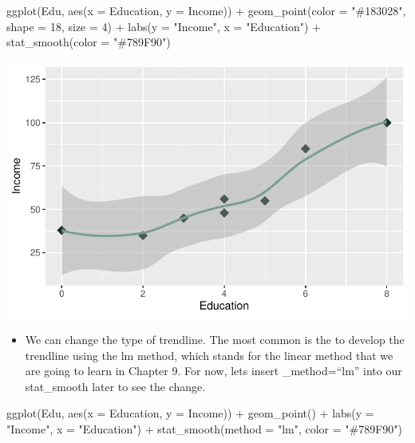 \documentclass[
  letterpaper,
  DIV=11,
  numbers=noendperiod]{scrreprt}
\newenvironment{Shaded}{\begin{snugshade}}{\end{snugshade}}
\newcommand{\AttributeTok}[1]{\textcolor[rgb]{0.40,0.45,0.13}{#1}}
\newcommand{\DecValTok}[1]{\textcolor[rgb]{0.68,0.00,0.00}{#1}}
\newcommand{\FunctionTok}[1]{\textcolor[rgb]{0.28,0.35,0.67}{#1}}
\newcommand{\NormalTok}[1]{\textcolor[rgb]{0.00,0.23,0.31}{#1}}
\newcommand{\SpecialCharTok}[1]{\textcolor[rgb]{0.37,0.37,0.37}{#1}}
\newcommand{\StringTok}[1]{\textcolor[rgb]{0.13,0.47,0.30}{#1}}
\providecommand{\tightlist}{%
  \setlength{\itemsep}{0pt}\setlength{\parskip}{0pt}}\usepackage{longtable,booktabs,array}
\begin{document}
\begin{Shaded}
\begin{Highlighting}[]
\FunctionTok{ggplot}\NormalTok{(Edu, }\FunctionTok{aes}\NormalTok{(}\AttributeTok{x =}\NormalTok{ Education, }\AttributeTok{y =}\NormalTok{ Income)) }\SpecialCharTok{+} \FunctionTok{geom\_point}\NormalTok{(}\AttributeTok{color =} \StringTok{"\#183028"}\NormalTok{,}
    \AttributeTok{shape =} \DecValTok{18}\NormalTok{, }\AttributeTok{size =} \DecValTok{4}\NormalTok{) }\SpecialCharTok{+} \FunctionTok{labs}\NormalTok{(}\AttributeTok{y =} \StringTok{"Income"}\NormalTok{, }\AttributeTok{x =} \StringTok{"Education"}\NormalTok{) }\SpecialCharTok{+} \FunctionTok{stat\_smooth}\NormalTok{(}\AttributeTok{color =} \StringTok{"\#789F90"}\NormalTok{)}
\end{Highlighting}
\end{Shaded}

\includegraphics{dataviz_files/figure-pdf/unnamed-chunk-49-1.pdf}

\begin{itemize}
\tightlist
\item
  We can change the type of trendline. The most common is the to develop
  the trendline using the lm method, which stands for the linear method
  that we are going to learn in Chapter 9. For now, lets insert
  \_method=``lm'' into our stat\_smooth later to see the change.
\end{itemize}

\begin{Shaded}
\begin{Highlighting}[]
\FunctionTok{ggplot}\NormalTok{(Edu, }\FunctionTok{aes}\NormalTok{(}\AttributeTok{x =}\NormalTok{ Education, }\AttributeTok{y =}\NormalTok{ Income)) }\SpecialCharTok{+} \FunctionTok{geom\_point}\NormalTok{() }\SpecialCharTok{+} \FunctionTok{labs}\NormalTok{(}\AttributeTok{y =} \StringTok{"Income"}\NormalTok{,}
    \AttributeTok{x =} \StringTok{"Education"}\NormalTok{) }\SpecialCharTok{+} \FunctionTok{stat\_smooth}\NormalTok{(}\AttributeTok{method =} \StringTok{"lm"}\NormalTok{, }\AttributeTok{color =} \StringTok{"\#789F90"}\NormalTok{)}
\end{Highlighting}
\end{Shaded}
\end{document}
